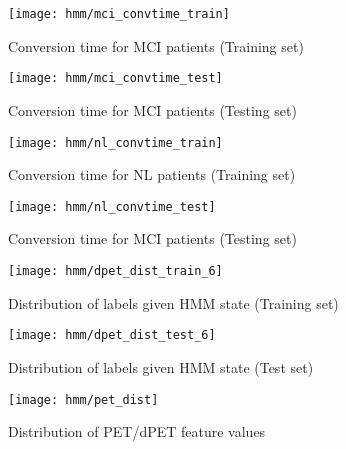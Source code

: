 \documentclass[12pt,a4paper]{article}
\begin{document}
\begin{figure}[H]
  \centering
  \texttt{[image: hmm/mci\_convtime\_train]}
  \caption{Conversion time for MCI patients (Training set)}  
\end{figure}

\begin{figure}[H]
  \centering
  \texttt{[image: hmm/mci\_convtime\_test]}
  \caption{Conversion time for MCI patients (Testing set)}  
\end{figure}

\begin{figure}[H]
  \centering
  \texttt{[image: hmm/nl\_convtime\_train]}
  \caption{Conversion time for NL patients (Training set)}  
\end{figure}

\begin{figure}[H]
  \centering
  \texttt{[image: hmm/nl\_convtime\_test]}
  \caption{Conversion time for MCI patients (Testing set)}  
\end{figure}

\begin{figure}[H]
  \centering
  \texttt{[image: hmm/dpet\_dist\_train\_6]}
  \caption{Distribution of labels given HMM state (Training set)}  
\end{figure}

\begin{figure}[H]
  \centering
  \texttt{[image: hmm/dpet\_dist\_test\_6]}
  \caption{Distribution of labels given HMM state (Test set)}  
\end{figure}

\begin{figure}[H]
  \centering
  \texttt{[image: hmm/pet\_dist]}
  \caption{Distribution of PET/dPET feature values}  
\end{figure}
\end{document}
